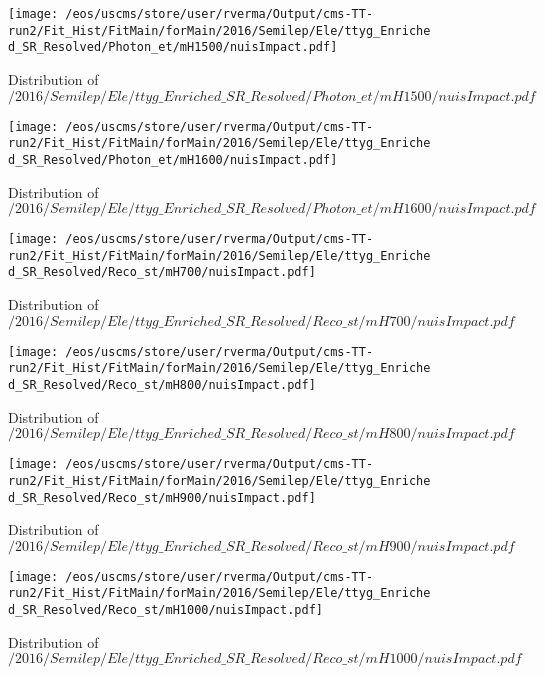 \begin{figure}
\centering
\texttt{[image: /eos/uscms/store/user/rverma/Output/cms-TT-run2/Fit\_Hist/FitMain/forMain/2016/Semilep/Ele/ttyg\_Enriched\_SR\_Resolved/Photon\_et/mH1500/nuisImpact.pdf]}
\caption{Distribution of $/2016/Semilep/Ele/ttyg\_Enriched\_SR\_Resolved/Photon\_et/mH1500/nuisImpact.pdf$}
\end{figure}

\begin{figure}
\centering
\texttt{[image: /eos/uscms/store/user/rverma/Output/cms-TT-run2/Fit\_Hist/FitMain/forMain/2016/Semilep/Ele/ttyg\_Enriched\_SR\_Resolved/Photon\_et/mH1600/nuisImpact.pdf]}
\caption{Distribution of $/2016/Semilep/Ele/ttyg\_Enriched\_SR\_Resolved/Photon\_et/mH1600/nuisImpact.pdf$}
\end{figure}

\begin{figure}
\centering
\texttt{[image: /eos/uscms/store/user/rverma/Output/cms-TT-run2/Fit\_Hist/FitMain/forMain/2016/Semilep/Ele/ttyg\_Enriched\_SR\_Resolved/Reco\_st/mH700/nuisImpact.pdf]}
\caption{Distribution of $/2016/Semilep/Ele/ttyg\_Enriched\_SR\_Resolved/Reco\_st/mH700/nuisImpact.pdf$}
\end{figure}

\begin{figure}
\centering
\texttt{[image: /eos/uscms/store/user/rverma/Output/cms-TT-run2/Fit\_Hist/FitMain/forMain/2016/Semilep/Ele/ttyg\_Enriched\_SR\_Resolved/Reco\_st/mH800/nuisImpact.pdf]}
\caption{Distribution of $/2016/Semilep/Ele/ttyg\_Enriched\_SR\_Resolved/Reco\_st/mH800/nuisImpact.pdf$}
\end{figure}

\begin{figure}
\centering
\texttt{[image: /eos/uscms/store/user/rverma/Output/cms-TT-run2/Fit\_Hist/FitMain/forMain/2016/Semilep/Ele/ttyg\_Enriched\_SR\_Resolved/Reco\_st/mH900/nuisImpact.pdf]}
\caption{Distribution of $/2016/Semilep/Ele/ttyg\_Enriched\_SR\_Resolved/Reco\_st/mH900/nuisImpact.pdf$}
\end{figure}

\begin{figure}
\centering
\texttt{[image: /eos/uscms/store/user/rverma/Output/cms-TT-run2/Fit\_Hist/FitMain/forMain/2016/Semilep/Ele/ttyg\_Enriched\_SR\_Resolved/Reco\_st/mH1000/nuisImpact.pdf]}
\caption{Distribution of $/2016/Semilep/Ele/ttyg\_Enriched\_SR\_Resolved/Reco\_st/mH1000/nuisImpact.pdf$}
\end{figure}

